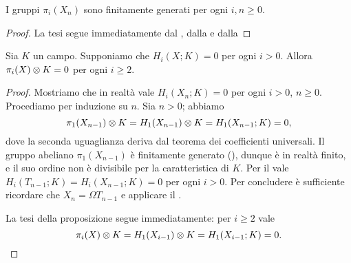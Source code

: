 \begin{corollary}
I gruppi \(\pi_i(X_n)\) sono finitamente generati per ogni \(i,n\ge 0\).
\end{corollary}
\begin{proof}
La tesi segue immediatamente dal , dalla  e dalla 
\end{proof}

\begin{proposition}
Sia \(K\) un campo. Supponiamo che \(H_i(X;K)=0\) per ogni \(i>0\). Allora \(\pi_i(X)\mathbin{\otimes} K=0\) per ogni \(i\ge 2\).
\end{proposition}
\begin{proof}
Mostriamo che in realtà vale \(H_i(X_n;K)=0\) per ogni \(i>0\), \(n\ge 0\). Procediamo per induzione su \(n\). Sia \(n>0\); abbiamo
\[
\pi_1(X_{n-1})\mathbin{\otimes} K=H_1(X_{n-1})\mathbin{\otimes} K=H_1(X_{n-1};K)=0,
\]
dove la seconda uguaglianza deriva dal teorema dei coefficienti universali. Il gruppo abeliano \(\pi_1(X_{n-1})\) è finitamente generato (), dunque è in realtà finito, e il suo ordine non è divisibile per la caratteristica di \(K\). Per il  vale \(H_i(T_{n-1};K)=H_i(X_{n-1};K)=0\) per ogni \(i>0\). Per concludere è sufficiente ricordare che \(X_n=\Omega T_{n-1}\) e applicare il .

La tesi della proposizione segue immediatamente: per  \(i\ge 2\) vale
\[
\pi_i(X)\mathbin{\otimes} K=H_1(X_{i-1})\mathbin{\otimes} K=H_1(X_{i-1};K)=0.\qedhere
\]
\end{proof}

